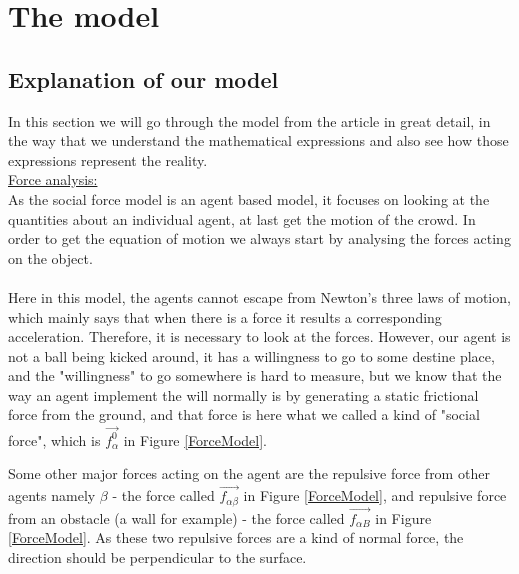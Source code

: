 \section{The model}
\label{sec:the-model}

\subsection{Explanation of our model}
In this section we will go through the model from the article \cite{self-org} in 
great detail, in the way that we understand the mathematical expressions and also 
see how those expressions represent the reality.\\

\underline{Force analysis:} \\
As the social force model is an agent based model, it focuses on looking at the 
quantities about an individual agent, at last get the motion of the crowd. In order 
to get the equation of motion we always start by analysing the forces acting on the object.\\\\

Here in this model, the agents cannot escape from Newton's three laws of motion, 
which mainly says that when there is a force it results a corresponding acceleration.  
Therefore, it is necessary to look at the forces.  However, our agent is not a ball 
being kicked around, it has a willingness to go to some destine place, and the 
"willingness" to go somewhere is hard to measure, but we know that the way an agent 
implement the will normally is by generating a static frictional force from the ground, 
and that force is here what we called a kind of "social force", which is 
$\vec{f^{0}_{\alpha}}$ in Figure \ref{ForceModel}. 

Some other major forces acting on the agent are the repulsive force from other agents 
namely $ \beta $ - the force called $ \vec{f_{\alpha\beta}} $ in Figure \ref{ForceModel}, 
and repulsive force from an obstacle (a wall for example) - the force called $ \vec{f_{\alpha B}} $ 
in Figure \ref{ForceModel}.  As these two repulsive forces are a kind of normal force, the direction 
should be perpendicular to the surface.

